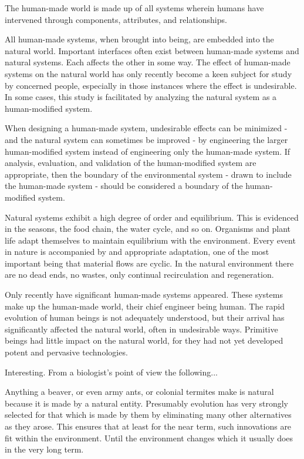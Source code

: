 The human-made world is made up of all systems wherein humans have intervened through components, attributes, and relationships.

All human-made systems, when brought into being, are embedded into the natural world. Important interfaces often exist between human-made systems and natural systems. Each affects the other in some way. The effect of human-made systems on the natural world has only recently become a keen subject for study by concerned people, especially in those instances where the effect is undesirable. In some cases, this study is facilitated by analyzing the natural system as a human-modified system.

When designing a human-made system, undesirable effects can be minimized - and the natural system can sometimes be improved - by engineering the larger human-modified system instead of engineering only the human-made system. If analysis, evaluation, and validation of the human-modified system are appropriate, then the boundary of the environmental system - drawn to include the human-made system - should be considered a boundary of the human-modified system.
	
Natural systems exhibit a high degree of order and equilibrium. This is evidenced in the seasons, the food chain, the water cycle, and so on. Organisms and plant life adapt themselves to maintain equilibrium with the environment. Every event in nature is accompanied by and appropriate adaptation, one of the most important being that material flows are cyclic. In the natural environment there are no dead ends, no wastes, only continual recirculation and regeneration.

Only recently have significant human-made systems appeared. These systems make up the human-made world, their chief engineer being human. The rapid evolution of human beings is not adequately understood, but their arrival has significantly affected the natural world, often in undesirable ways. Primitive beings had little impact on the natural world, for they had not yet developed potent and pervasive technologies.

	Interesting. From a biologist’s point of view the following...
    
Anything a beaver, or even army ants, or colonial termites make is natural because it is made by a natural entity. Presumably evolution has very strongly selected for that which is made by them by eliminating many other alternatives as they arose. This ensures that at least for the near term, such innovations are fit within the environment. Until the environment changes which it usually does in the very long term.

